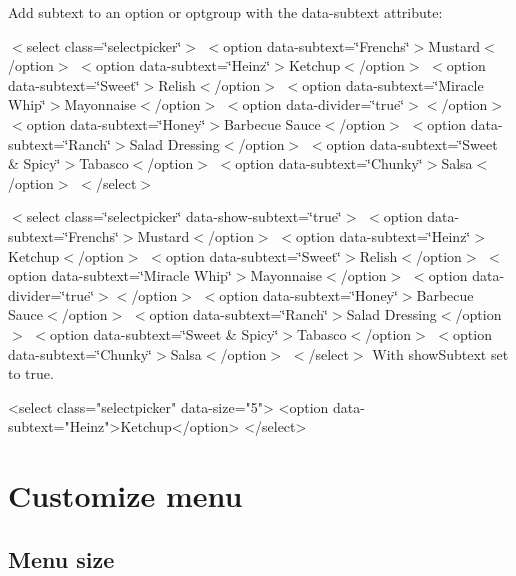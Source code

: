 Add subtext to an option or optgroup with the {\ttfamily data-\/subtext} attribute\+:

  $<$select class=\char`\"{}selectpicker\char`\"{}$>$ $<$option data-\/subtext=\char`\"{}\+French\textquotesingle{}s\char`\"{}$>$Mustard$<$/option$>$ $<$option data-\/subtext=\char`\"{}\+Heinz\char`\"{}$>$Ketchup$<$/option$>$ $<$option data-\/subtext=\char`\"{}\+Sweet\char`\"{}$>$Relish$<$/option$>$ $<$option data-\/subtext=\char`\"{}\+Miracle Whip\char`\"{}$>$Mayonnaise$<$/option$>$ $<$option data-\/divider=\char`\"{}true\char`\"{}$>$$<$/option$>$ $<$option data-\/subtext=\char`\"{}\+Honey\char`\"{}$>$Barbecue Sauce$<$/option$>$ $<$option data-\/subtext=\char`\"{}\+Ranch\char`\"{}$>$Salad Dressing$<$/option$>$ $<$option data-\/subtext=\char`\"{}\+Sweet \& Spicy\char`\"{}$>$Tabasco$<$/option$>$ $<$option data-\/subtext=\char`\"{}\+Chunky\char`\"{}$>$Salsa$<$/option$>$ $<$/select$>$ 

  $<$select class=\char`\"{}selectpicker\char`\"{} data-\/show-\/subtext=\char`\"{}true\char`\"{}$>$ $<$option data-\/subtext=\char`\"{}\+French\textquotesingle{}s\char`\"{}$>$Mustard$<$/option$>$ $<$option data-\/subtext=\char`\"{}\+Heinz\char`\"{}$>$Ketchup$<$/option$>$ $<$option data-\/subtext=\char`\"{}\+Sweet\char`\"{}$>$Relish$<$/option$>$ $<$option data-\/subtext=\char`\"{}\+Miracle Whip\char`\"{}$>$Mayonnaise$<$/option$>$ $<$option data-\/divider=\char`\"{}true\char`\"{}$>$$<$/option$>$ $<$option data-\/subtext=\char`\"{}\+Honey\char`\"{}$>$Barbecue Sauce$<$/option$>$ $<$option data-\/subtext=\char`\"{}\+Ranch\char`\"{}$>$Salad Dressing$<$/option$>$ $<$option data-\/subtext=\char`\"{}\+Sweet \& Spicy\char`\"{}$>$Tabasco$<$/option$>$ $<$option data-\/subtext=\char`\"{}\+Chunky\char`\"{}$>$Salsa$<$/option$>$ $<$/select$>$ With {\ttfamily show\+Subtext} set to true.  


\begin{DoxyCode}
<select class="selectpicker" data-size="5">
  <option data-subtext="Heinz">Ketchup</option>
</select>
\end{DoxyCode}


\section*{Customize menu}





\subsection*{Menu size}

